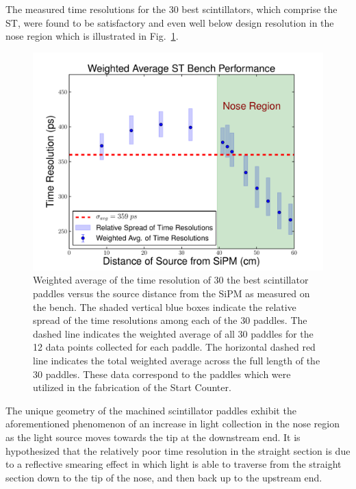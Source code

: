 The measured time resolutions for the 30 best scintillators, which comprise the ST, were found to be satisfactory and even well below design resolution in the nose region which is illustrated in Fig.~\ref{fig:time_res_comp_final_30}.
	\begin{figure}[!htb]
	\centering
	\includegraphics[width=1.0\columnwidth]{fabrication/figs/wtr_vs_dist_v2}
	\caption{Weighted average of the time resolution of 30 the best scintillator paddles versus the source distance from the SiPM as measured on the bench.  The shaded vertical blue boxes indicate the relative spread of the time resolutions among each of the 30 paddles.  The dashed line indicates the weighted average of all 30 paddles for the 12 data points collected for each paddle.  The horizontal dashed red line indicates the total weighted average across the full length of the 30 paddles.  These data correspond to the paddles which were utilized in the fabrication of the Start Counter.}
	\label{fig:time_res_comp_final_30}
	\end{figure}

The unique geometry of the machined scintillator paddles exhibit the aforementioned phenomenon of an increase in light collection in the nose region as the light source moves towards the tip at the downstream end.  It is hypothesized that the relatively poor time resolution in the straight section is due to a reflective smearing effect in which light is able to traverse from the straight section down to the tip of the nose, and then back up to the upstream end.

